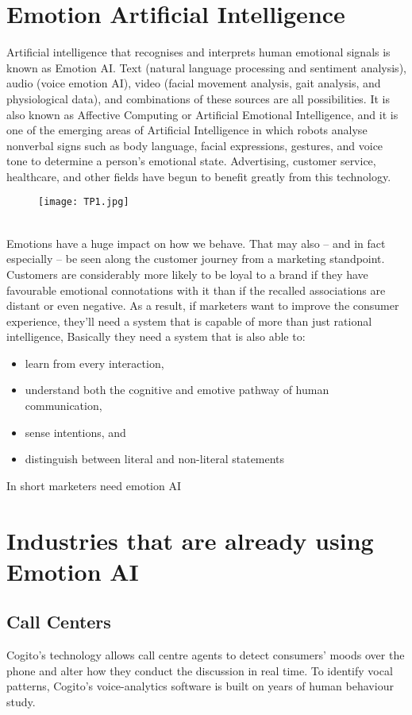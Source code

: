 \documentclass[12pt]{article}
\begin{document}
\section{Emotion Artificial Intelligence}
Artificial intelligence that recognises and interprets human emotional signals is known as Emotion AI. Text (natural language processing and sentiment analysis), audio (voice emotion AI), video (facial movement analysis, gait analysis, and physiological data), and combinations of these sources are all possibilities.
It is also known as Affective Computing or Artificial Emotional Intelligence, and it is one of the emerging areas of Artificial Intelligence in which robots analyse nonverbal signs such as body language, facial expressions, gestures, and voice tone to determine a person's emotional state. Advertising, customer service, healthcare, and other fields have begun to benefit greatly from this technology.
\\
\begin{figure}[h]
\centering
\texttt{[image: TP1.jpg]}
\label{fig_1}
\end{figure}
\\
Emotions have a huge impact on how we behave. That may also – and in fact especially – be seen along the customer journey from a marketing standpoint. Customers are considerably more likely to be loyal to a brand if they have favourable emotional connotations with it than if the recalled associations are distant or even negative. As a result, if marketers want to improve the consumer experience, they'll need a system that is capable of more than just rational intelligence, Basically they need a system that is also able to:
\begin{itemize}
 \item learn from every interaction, \item understand both the cognitive and emotive pathway of human communication, \item sense intentions, and \item distinguish between literal and non-literal statements
\end{itemize}
In short marketers need emotion AI
\section{Industries that are already using Emotion AI}
\subsection{Call Centers}
Cogito's technology allows call centre agents to detect consumers' moods over the phone and alter how they conduct the discussion in real time. To identify vocal patterns, Cogito's voice-analytics software is built on years of human behaviour study.
\end{document}
